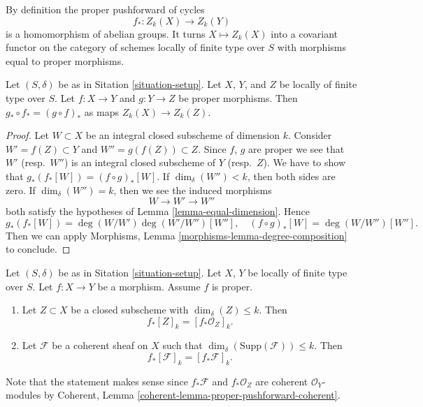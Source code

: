 \noindent
By definition the proper pushforward of cycles
$$
f_* : Z_k(X) \longrightarrow Z_k(Y)
$$
is a homomorphism of abelian groups. It turns $X \mapsto Z_k(X)$
into a covariant functor on the category of schemes locally of
finite type over $S$ with morphisms equal to proper morphisms.

\begin{lemma}
\label{lemma-compose-pushforward}
Let $(S, \delta)$ be as in Sitation \ref{situation-setup}.
Let $X$, $Y$, and $Z$ be locally of finite type over $S$.
Let $f : X \to Y$ and $g : Y \to Z$ be proper morphisms.
Then $g_* \circ f_* = (g \circ f)_*$ as maps $Z_k(X) \to Z_k(Z)$.
\end{lemma}

\begin{proof}
Let $W \subset X$ be an integral closed subscheme of dimension $k$.
Consider $W' = f(Z) \subset Y$ and $W'' = g(f(Z)) \subset Z$.
Since $f$, $g$ are proper we see that $W'$ (resp.\ $W''$) is
an integral closed subscheme of $Y$ (resp.\ $Z$).
We have to show that $g_*(f_*[W]) = (f \circ g)_*[W]$.
If $\dim_\delta(W'') < k$, then both sides are zero.
If $\dim_\delta(W'') = k$, then we see the induced morphisms
$$
W \longrightarrow
W' \longrightarrow
W''
$$
both satisfy the hypotheses of Lemma \ref{lemma-equal-dimension}. Hence
$$
g_*(f_*[W]) = \deg(W/W')\deg(W'/W'')[W''],
\quad
(f \circ g)_*[W] = \deg(W/W'')[W''].
$$
Then we can apply
Morphisms, Lemma \ref{morphisms-lemma-degree-composition}
to conclude.
\end{proof}

\begin{lemma}
\label{lemma-cycle-push-sheaf}
Let $(S, \delta)$ be as in Sitation \ref{situation-setup}.
Let $X$, $Y$ be locally of finite type over $S$.
Let $f : X \to Y$ be a morphism.
Assume $f$ is proper.
\begin{enumerate}
\item Let $Z \subset X$ be a closed subscheme with $\dim_\delta(Z) \leq k$.
Then
$$
f_*[Z]_k = [f_*{\mathcal O}_Z]_k.
$$
\item Let $\mathcal{F}$ be a coherent sheaf on $X$ such that
$\dim_\delta(\text{Supp}(\mathcal{F})) \leq k$. Then
$$
f_*[\mathcal{F}]_k = [f_*{\mathcal F}]_k.
$$
\end{enumerate}
Note that the statement makes sense since $f_*\mathcal{F}$ and
$f_*\mathcal{O}_Z$ are coherent $\mathcal{O}_Y$-modules by
Coherent, Lemma \ref{coherent-lemma-proper-pushforward-coherent}.
\end{lemma}

